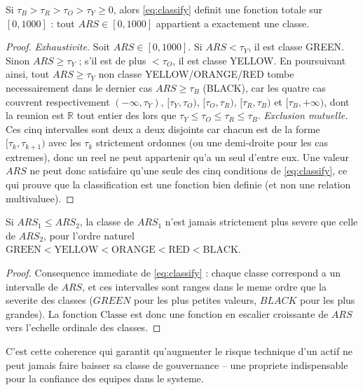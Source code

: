 \begin{propriete}
\label{prop:classify-total}
Si $\tau_B>\tau_R>\tau_O>\tau_Y\ge0$, alors \cref{eq:classify} definit une fonction
totale sur $[0,1000]$ : tout $ARS\in[0,1000]$ appartient a exactement une classe.
\end{propriete}

\begin{proof}
\emph{Exhaustivite.} Soit $ARS\in[0,1000]$. Si $ARS<\tau_Y$, il est classe GREEN. Sinon
$ARS\ge\tau_Y$ ; s'il est de plus $<\tau_O$, il est classe YELLOW. En poursuivant
ainsi, tout $ARS\ge\tau_Y$ non classe YELLOW/ORANGE/RED tombe necessairement dans le
dernier cas $ARS\ge\tau_B$ (BLACK), car les quatre cas couvrent respectivement
$(-\infty,\tau_Y)$, $[\tau_Y,\tau_O)$, $[\tau_O,\tau_R)$, $[\tau_R,\tau_B)$ et
$[\tau_B,+\infty)$, dont la reunion est $\mathbb{R}$ tout entier des lors que
$\tau_Y\le\tau_O\le\tau_R\le\tau_B$.
\emph{Exclusion mutuelle.} Ces cinq intervalles sont deux a deux disjoints car
chacun est de la forme $[\tau_{k},\tau_{k+1})$ avec les $\tau_k$ strictement
ordonnes (ou une demi-droite pour les cas extremes), donc un reel ne peut appartenir
qu'a un seul d'entre eux. Une valeur $ARS$ ne peut donc satisfaire qu'une seule
des cinq conditions de \cref{eq:classify}, ce qui prouve que la classification est
une fonction bien definie (et non une relation multivaluee).
\end{proof}

\begin{corollaire}
\label{cor:classify-ordre}
Si $ARS_1\le ARS_2$, la classe de $ARS_1$ n'est jamais strictement plus severe que
celle de $ARS_2$, pour l'ordre naturel $\text{GREEN}<\text{YELLOW}<\text{ORANGE}
<\text{RED}<\text{BLACK}$.
\end{corollaire}

\begin{proof}
Consequence immediate de \cref{eq:classify} : chaque classe correspond a un
intervalle de $ARS$, et ces intervalles sont ranges dans le meme ordre que la
severite des classes ($GREEN$ pour les plus petites valeurs, $BLACK$ pour les plus
grandes). La fonction $\mathrm{Classe}$ est donc une fonction en escalier
croissante de $ARS$ vers l'echelle ordinale des classes.
\end{proof}

C'est cette coherence qui garantit qu'augmenter le risque technique d'un actif ne
peut jamais faire baisser sa classe de gouvernance -- une propriete indispensable
pour la confiance des equipes dans le systeme.

